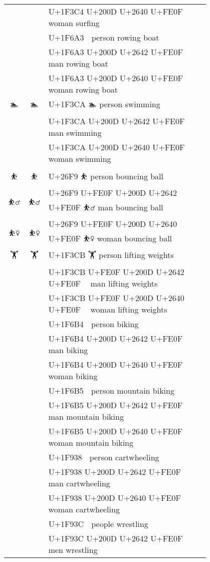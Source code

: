\documentclass[a4paper,12pt]{ltjarticle}
\newcommand{\fontA}[1]{{\fontspec[RawFeature={mode=harf,+dist,+ccmp}]{Segoe UI Emoji} #1}}
\newcommand{\fontB}[1]{{\fontspec[RawFeature={mode=harf,+dist,+ccmp}]{Noto Color Emoji} #1}}
\begin{document}
\begin{longtable}[c]{ccp{0.8\linewidth}}
\fontA{🏄‍♀️}&\fontB{🏄‍♀️}&U+1F3C4 U+200D U+2640 U+FE0F 🏄‍♀️ woman surfing\\
\fontA{🚣}&\fontB{🚣}&U+1F6A3 🚣 person rowing boat\\
\fontA{🚣‍♂️}&\fontB{🚣‍♂️}&U+1F6A3 U+200D U+2642 U+FE0F 🚣‍♂️ man rowing boat\\
\fontA{🚣‍♀️}&\fontB{🚣‍♀️}&U+1F6A3 U+200D U+2640 U+FE0F 🚣‍♀️ woman rowing boat\\
\fontA{🏊}&\fontB{🏊}&U+1F3CA 🏊 person swimming\\
\fontA{🏊‍♂️}&\fontB{🏊‍♂️}&U+1F3CA U+200D U+2642 U+FE0F 🏊‍♂️ man swimming\\
\fontA{🏊‍♀️}&\fontB{🏊‍♀️}&U+1F3CA U+200D U+2640 U+FE0F 🏊‍♀️ woman swimming\\
\fontA{⛹}&\fontB{⛹}&U+26F9 ⛹ person bouncing ball\\
\fontA{⛹️‍♂️}&\fontB{⛹️‍♂️}&U+26F9 U+FE0F U+200D U+2642 U+FE0F ⛹️‍♂️ man bouncing ball\\
\fontA{⛹️‍♀️}&\fontB{⛹️‍♀️}&U+26F9 U+FE0F U+200D U+2640 U+FE0F ⛹️‍♀️ woman bouncing ball\\
\fontA{🏋}&\fontB{🏋}&U+1F3CB 🏋 person lifting weights\\
\fontA{🏋️‍♂️}&\fontB{🏋️‍♂️}&U+1F3CB U+FE0F U+200D U+2642 U+FE0F 🏋️‍♂️ man lifting weights\\
\fontA{🏋️‍♀️}&\fontB{🏋️‍♀️}&U+1F3CB U+FE0F U+200D U+2640 U+FE0F 🏋️‍♀️ woman lifting weights\\
\fontA{🚴}&\fontB{🚴}&U+1F6B4 🚴 person biking\\
\fontA{🚴‍♂️}&\fontB{🚴‍♂️}&U+1F6B4 U+200D U+2642 U+FE0F 🚴‍♂️ man biking\\
\fontA{🚴‍♀️}&\fontB{🚴‍♀️}&U+1F6B4 U+200D U+2640 U+FE0F 🚴‍♀️ woman biking\\
\fontA{🚵}&\fontB{🚵}&U+1F6B5 🚵 person mountain biking\\
\fontA{🚵‍♂️}&\fontB{🚵‍♂️}&U+1F6B5 U+200D U+2642 U+FE0F 🚵‍♂️ man mountain biking\\
\fontA{🚵‍♀️}&\fontB{🚵‍♀️}&U+1F6B5 U+200D U+2640 U+FE0F 🚵‍♀️ woman mountain biking\\
\fontA{🤸}&\fontB{🤸}&U+1F938 🤸 person cartwheeling\\
\fontA{🤸‍♂️}&\fontB{🤸‍♂️}&U+1F938 U+200D U+2642 U+FE0F 🤸‍♂️ man cartwheeling\\
\fontA{🤸‍♀️}&\fontB{🤸‍♀️}&U+1F938 U+200D U+2640 U+FE0F 🤸‍♀️ woman cartwheeling\\
\fontA{🤼}&\fontB{🤼}&U+1F93C 🤼 people wrestling\\
\fontA{🤼‍♂️}&\fontB{🤼‍♂️}&U+1F93C U+200D U+2642 U+FE0F 🤼‍♂️ men wrestling\\

\end{longtable}
\end{document}
